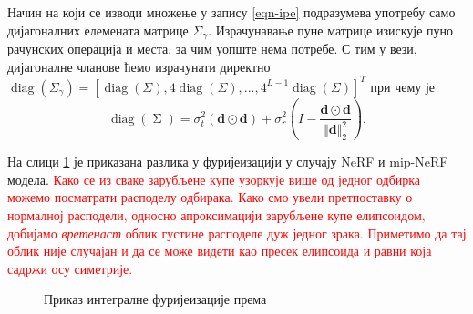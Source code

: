 \documentclass[12pt, a4paper, twoside]{book}
\numberwithin{equation}{chapter}
\numberwithin{theorem}{section}
\numberwithin{definition}{section}
\numberwithin{definitionChapter}{chapter}
\begin{document}
Начин на који се изводи множење у запису \ref{eqn-ipe} подразумева употребу само дијагоналних елемената матрице
$\Sigma_\gamma$. Израчунавање пуне матрице изискује пуно рачунских операција и места, за чим уопште нема потребе.
С тим у вези, дијагоналне чланове ћемо израчунати директно $\operatorname{diag}(\Sigma_\gamma)
= \left[\operatorname{diag}(\Sigma), 4\operatorname{diag}(\Sigma), ..., 4^{L-1}\operatorname{diag}(\Sigma)\right]^T$ при чему је
\begin{equation}
	\operatorname{diag}(\operatorname{\Sigma}) = \sigma_t^2(\mathbf{d}\odot\mathbf{d}) +
		\sigma_r^2\left(I - \frac{\mathbf{d} \odot \mathbf{d}}{\Vert\mathbf{d}\Vert_2^2}\right).
\end{equation}

На слици \ref{fig-mipnerf-ipe} је приказана разлика у фуријеизацији у случају NeRF и mip-NeRF модела.
\textcolor{red}{Како се из сваке зарубљене купе узоркује више од једног одбирка можемо посматрати расподелу одбирака.
Како смо увели претпоставку о нормалној расподели, односно апроксимацији зарубљене купе елипсоидом,
добијамо \textit{вретенаст} облик густине расподеле дуж једног зрака. Приметимо да тај облик није случајан
и да се може видети као пресек елипсоида и равни која садржи осу симетрије.}

\begin{figure}[H]
	\begin{center}
	\end{center}
	\caption{Приказ интегралне фуријеизације према \cite{mip-nerf}}
	\label{fig-mipnerf-ipe}
\end{figure}
\end{document}
